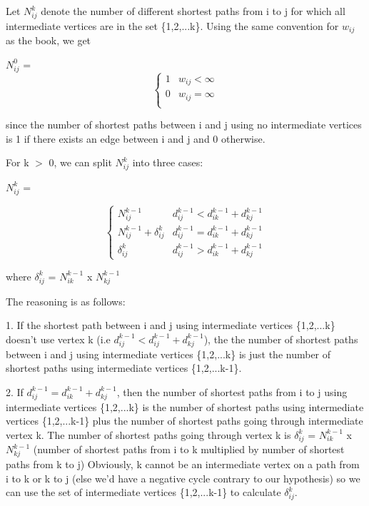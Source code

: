 \documentclass[11pt,a4paper]{article}
\begin{document}
Let $N_{ij}^{k}$ denote the number of different shortest paths from i to j for which all intermediate vertices are in the set \{1,2,...k\}. Using the same convention for $w_{ij}$ as the book, we get

$N_{ij}^{0}$ =  
\[ \begin{cases} 
      1 & w_{ij} < \infty \\
      0 & w_{ij} = \infty \\
   \end{cases}
\]

since the number of shortest paths between i and j using no intermediate vertices is 1 if there exists an edge between i and j and 0 otherwise.

For k $>$ 0, we can split $N_{ij}^{k}$ into three cases:

$N_{ij}^{k}$ = 

\[ \begin{cases} 
      N_{ij}^{k-1} & d_{ij}^{k-1} < d_{ik}^{k-1} + d_{kj}^{k-1} \\
      N_{ij}^{k-1} + \delta_{ij}^{k} & d_{ij}^{k-1} = d_{ik}^{k-1} + d_{kj}^{k-1} \\
      \delta_{ij}^{k} & d_{ij}^{k-1} > d_{ik}^{k-1} + d_{kj}^{k-1}
   \end{cases}
\]

where $\delta_{ij}^{k}$ = $N_{ik}^{k-1}$ x $N_{kj}^{k-1}$

The reasoning is as follows:

1. If the shortest path between i and j using intermediate vertices \{1,2,...k\} doesn't use vertex k (i.e $d_{ij}^{k-1} < d_{ij}^{k-1} + d_{kj}^{k-1}$), the the number of shortest paths between i and j using intermediate vertices \{1,2,...k\} is just the number of shortest paths using intermediate vertices \{1,2,...k-1\}. 

2. If $d_{ij}^{k-1} = d_{ik}^{k-1} + d_{kj}^{k-1}$, then the number of shortest paths from i to j using intermediate vertices \{1,2,...k\} is the number of shortest paths using intermediate vertices \{1,2,...k-1\} plus the number of shortest paths going through intermediate vertex k. The number of shortest paths going through vertex k is $\delta_{ij}^{k}$ = $N_{ik}^{k-1}$ x $N_{kj}^{k-1}$ (number of shortest paths from i to k multiplied by number of shortest paths from k to j) Obviously, k cannot be an intermediate vertex on a path from i to k or k to j (else we'd have a negative cycle contrary to our hypothesis) so we can use the set of intermediate vertices \{1,2,...k-1\} to calculate $\delta_{ij}^{k}$.
\end{document}
